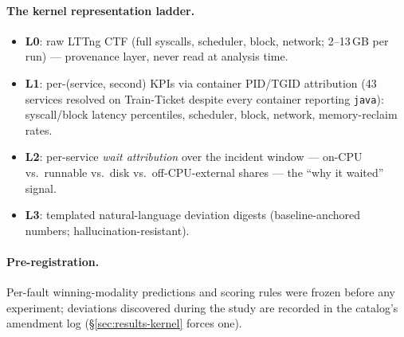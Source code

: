 \paragraph{The kernel representation ladder.}
\begin{itemize}
  \item \textbf{L0}: raw LTTng CTF (full syscalls, scheduler, block, network;
  2--13\,GB per run) --- provenance layer, never read at analysis time.
  \item \textbf{L1}: per-(service, second) KPIs via container PID/TGID attribution
  (43 services resolved on Train-Ticket despite every container reporting
  \texttt{java}): syscall/block latency percentiles, scheduler, block, network,
  memory-reclaim rates.
  \item \textbf{L2}: per-service \emph{wait attribution} over the incident window ---
  on-CPU vs.\ runnable vs.\ disk vs.\ off-CPU-external shares --- the ``why it
  waited'' signal.
  \item \textbf{L3}: templated natural-language deviation digests
  (baseline-anchored numbers; hallucination-resistant).
\end{itemize}

\paragraph{Pre-registration.} Per-fault winning-modality predictions and scoring rules
were frozen before any experiment; deviations discovered during the study are recorded
in the catalog's amendment log (\S\ref{sec:results-kernel} forces one).
